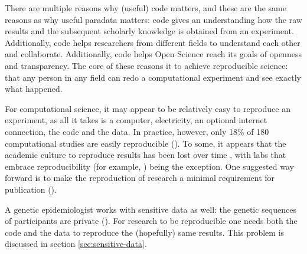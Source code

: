 
There are multiple reasons why (useful) code matters,
and these are the same reasons as why useful paradata matters:
code gives an understanding how the raw results 
and the subsequent scholarly knowledge is obtained from an experiment.
Additionally, code helps researchers from different fields 
to understand each other and collaborate.
Additionally, code helps Open Science reach its goals of openness and
transparency.
The core of these reasons it to achieve reproducible science:
that any person in any field can redo a computational experiment
and see exactly what happened.


For computational science, it may appear to be relatively easy to 
reproduce an experiment, as all it takes is a computer, electricity,
an optional internet connection, the code and the data.
In practice, however, 
only 18\% of 180 computational studies 
are easily reproducible (\cite{stodden2018empirical}).
To some, it appears that 
the academic culture to reproduce results 
has been lost over time \cite{peng2011reproducible},
with labs that embrace reproducibility (for example, \cite{barba2016hard})
being the exception.
One suggested way forward is to make the reproduction of 
research a minimal requirement for publication (\cite{peng2011reproducible}).


A genetic epidemiologist works with sensitive data as well:
the genetic sequences of participants are private (\cite{clayton2019law}).
For research to be reproducible one needs both the code and the data
to reproduce the (hopefully) same results.
This problem is discussed in section \ref{sec:sensitive-data}.


